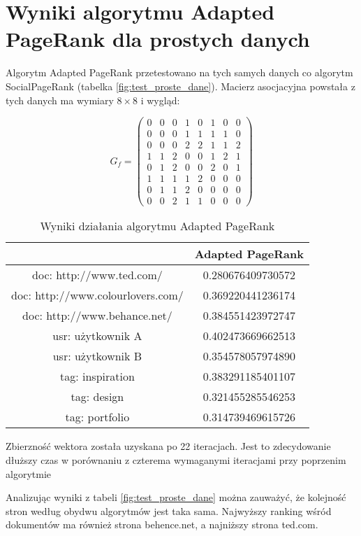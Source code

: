 \section{Wyniki algorytmu Adapted PageRank dla prostych danych}


Algorytm Adapted PageRank przetestowano na tych samych danych co algorytm SocialPageRank (tabelka \ref{fig:test_proste_dane}). Macierz asocjacyjna powstała z tych danych ma wymiary $8 \times 8$ i wygląd:

\[
 G_f =
 \begin{pmatrix}
0 & 0 & 0 & 1	 & 0 & 1 & 0 & 0\\
0 & 0 & 0 & 1 & 1 & 1 & 1 & 0\\
0 & 0 & 0 & 2 & 2 & 1 & 1 & 2\\
1 & 1 & 2 & 0 & 0 & 1 & 2 & 1\\
0 & 1 & 2 & 0 & 0 & 2 & 0 & 1\\
1 & 1 & 1 & 1 & 2 & 0 & 0 & 0\\
0 & 1 & 1 & 2 & 0 & 0 & 0 & 0\\
0 & 0 & 2 & 1 & 1 & 0 & 0 & 0
 \end{pmatrix}
\]

\begin{table}[h]
  \centering
    \begin{tabular}{ | c | c | }
\hline
&Adapted PageRank \\
\hline
doc: http://www.ted.com/ & 0.280676409730572 \\
doc: http://www.colourlovers.com/ & 0.369220441236174 \\
doc: http://www.behance.net/ & 0.384551423972747 \\
\hline
usr: użytkownik A & 0.402473669662513 \\
usr: użytkownik B & 0.354578057974890 \\
\hline
tag: inspiration & 0.383291185401107 \\
tag: design & 0.321455285546253 \\ 
tag: portfolio	 & 0.314739469615726 \\
\hline
\end{tabular}
  \caption{Wyniki działania algorytmu Adapted PageRank}
  \label{fig:adapted_page_simple_wyniki}
\end{table}

Zbierzność wektora została uzyskana po 22 iteracjach. Jest to zdecydowanie dłuższy czas w porównaniu z czterema wymaganymi iteracjami przy poprzenim algorytmie


Analizując wyniki z tabeli \ref{fig:test_proste_dane} można zauważyć, że kolejność stron według obydwu algorytmów jest taka sama. Najwyższy ranking wśród dokumentów ma również strona behence.net, a najniższy strona ted.com. 

